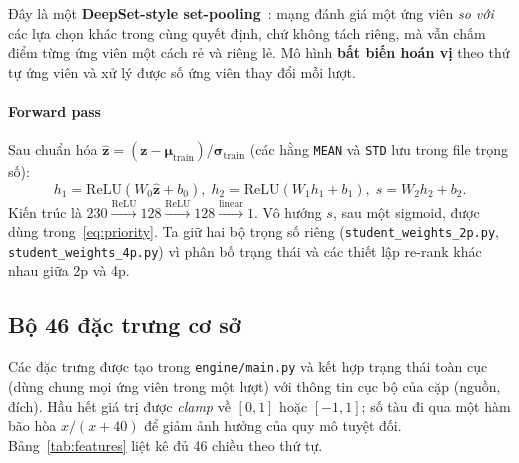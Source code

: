 \documentclass[conference]{IEEEtran}
\begin{document}
Đây là một \textbf{DeepSet-style set-pooling}~\cite{deepsets2017}: mạng đánh giá một ứng viên \textit{so với} các lựa chọn khác trong cùng quyết định, chứ không tách riêng, mà vẫn chấm điểm từng ứng viên một cách rẻ và riêng lẻ. Mô hình \textbf{bất biến hoán vị} theo thứ tự ứng viên và xử lý được số ứng viên thay đổi mỗi lượt.

\paragraph{Forward pass}
Sau chuẩn hóa $\hat{\mathbf{z}} = (\mathbf{z} - \boldsymbol{\mu}_{\mathrm{train}}) / \boldsymbol{\sigma}_{\mathrm{train}}$ (các hằng \texttt{MEAN} và \texttt{STD} lưu trong file trọng số):
\begin{equation}
h_1 = \mathrm{ReLU}(W_0 \hat{\mathbf{z}} + b_0),\;
h_2 = \mathrm{ReLU}(W_1 h_1 + b_1),\;
s = W_2 h_2 + b_2.
\end{equation}
Kiến trúc là $230 \xrightarrow{\mathrm{ReLU}} 128 \xrightarrow{\mathrm{ReLU}} 128 \xrightarrow{\mathrm{linear}} 1$. Vô hướng $s$, sau một sigmoid, được dùng trong~\eqref{eq:priority}. Ta giữ hai bộ trọng số riêng (\texttt{student\_weights\_2p.py}, \texttt{student\_weights\_4p.py}) vì phân bố trạng thái và các thiết lập re-rank khác nhau giữa 2p và 4p.

\subsection{Bộ 46 đặc trưng cơ sở}
\label{sec:features}

Các đặc trưng được tạo trong \texttt{engine/main.py} và kết hợp trạng thái toàn cục (dùng chung mọi ứng viên trong một lượt) với thông tin cục bộ của cặp (nguồn, đích). Hầu hết giá trị được \textit{clamp} về $[0,1]$ hoặc $[-1,1]$; số tàu đi qua một hàm bão hòa $x/(x+40)$ để giảm ảnh hưởng của quy mô tuyệt đối. Bảng~\ref{tab:features} liệt kê đủ 46 chiều theo thứ tự.
\end{document}

